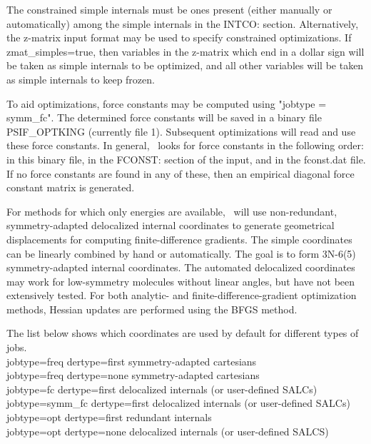 The constrained simple internals must be ones present (either manually or
automatically) among the simple internals in the INTCO: section.  Alternatively,
the z-matrix input format may be used to specify constrained optimizations.
If zmat\_simples=true, then variables in the z-matrix which end in
a dollar sign will be taken as simple internals to be optimized, and
all other variables will be taken as simple internals to keep frozen.

To aid optimizations, force constants may be computed using "jobtype = symm\_fc".
The determined force constants will be saved in a binary file PSIF\_OPTKING
(currently file 1).  Subsequent optimizations will read and use these force
constants.  In general, \PSIthree\ looks for force constants in the following
order: in this binary file, in the FCONST: section of the input, and in the fconst.dat
file.  If no force constants are found in any of these, then an empirical 
diagonal force constant matrix is generated.

For methods for which only energies are available, \PSIthree\ will use non-redundant,
symmetry-adapted delocalized internal coordinates to generate geometrical
displacements for computing finite-difference gradients. The simple
coordinates can be linearly combined by hand or automatically.  The goal
is to form 3N-6(5) symmetry-adapted internal coordinates.  The automated
delocalized coordinates may work for low-symmetry molecules without
linear angles, but have not been extensively tested.  For both analytic-
and finite-difference-gradient optimization methods, Hessian updates are
performed using the BFGS method.

The list below shows which coordinates are used by default for different types of jobs. \\
jobtype=freq    dertype=first  symmetry-adapted cartesians \\
jobtype=freq    dertype=none   symmetry-adapted cartesians \\
jobtype=fc      dertype=first  delocalized internals (or user-defined SALCs) \\
jobtype=symm\_fc dertype=first  delocalized internals (or user-defined SALCs) \\
jobtype=opt     dertype=first  redundant internals \\
jobtype=opt     dertype=none   delocalized internals (or user-defined SALCS) \\
\\

